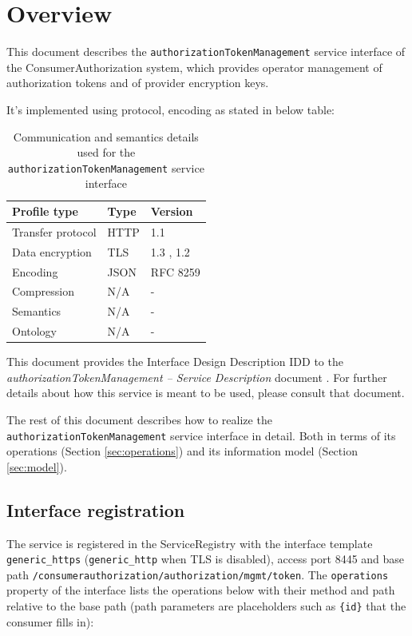 \documentclass[a4paper]{arrowhead}
\begin{document}
\section{Overview}
\label{sec:overview}

This document describes the \texttt{authorization\allowbreak{}Token\allowbreak{}Management} service interface of the ConsumerAuthorization system, which provides operator management of authorization tokens and of provider encryption keys.

It's implemented using protocol, encoding as stated in below table:
\begin{table}[ht!]
  \centering
  \begin{tabular}{|l|l|l|}
    \hline
    \rowcolor{gray!33} Profile type & Type & Version \\ \hline
    Transfer protocol & HTTP & 1.1 \cite{rfc9112} \\ \hline
    Data encryption & TLS & 1.3 \cite{rfc8446}, 1.2 \cite{rfc5246} \\ \hline
    Encoding & JSON & RFC 8259 \cite{rfc8259} \\ \hline
    Compression & N/A & - \\ \hline
    Semantics & N/A & - \\ \hline
    Ontology & N/A & - \\ \hline
  \end{tabular}
  \caption{Communication and semantics details used for the \texttt{authorization\allowbreak{}Token\allowbreak{}Management} service interface}
  \label{tab:comunication_semantics_profile}
\end{table}

This document provides the Interface Design Description IDD to the \textit{authorizationTokenManagement -- Service Description} document \cite{ca-authorizationTokenManagement-sd}.
For further details about how this service is meant to be used, please consult that document.

The rest of this document describes how to realize the \texttt{authorization\allowbreak{}Token\allowbreak{}Management} service
interface in detail. Both in terms of its operations (Section \ref{sec:operations}) and its information model (Section \ref{sec:model}).

\subsection{Interface registration}

The service is registered in the ServiceRegistry with the interface template \texttt{generic\_\allowbreak{}https} (\texttt{generic\_\allowbreak{}http} when TLS is disabled), access port 8445 and base path \texttt{/\allowbreak{}consumerauthorization/\allowbreak{}authorization/\allowbreak{}mgmt/\allowbreak{}token}. The \texttt{operations} property of the interface lists the operations below with their method and path relative to the base path (path parameters are placeholders such as \texttt{\{id\}} that the consumer fills in):
\end{document}
